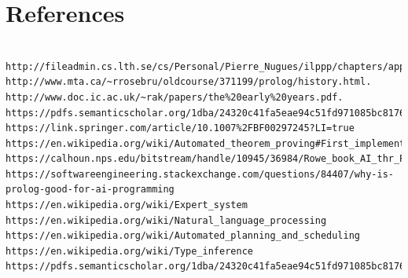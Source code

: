 \documentclass[14pt]{article}
\begin{document}
\section{References} 
\begin{verbatim}
	
http://fileadmin.cs.lth.se/cs/Personal/Pierre_Nugues/ilppp/chapters/appA.pdf.
http://www.mta.ca/~rrosebru/oldcourse/371199/prolog/history.html. 
http://www.doc.ic.ac.uk/~rak/papers/the%20early%20years.pdf.
https://pdfs.semanticscholar.org/1dba/24320c41fa5eae94c51fd971085bc8176dd7.pdf
https://link.springer.com/article/10.1007%2FBF00297245?LI=true
https://en.wikipedia.org/wiki/Automated_theorem_proving#First_implementations
https://calhoun.nps.edu/bitstream/handle/10945/36984/Rowe_book_AI_thr_Prolog_preface.pdf https://softwareengineering.stackexchange.com/questions/84407/why-is-prolog-good-for-ai-programming
https://en.wikipedia.org/wiki/Expert_system
https://en.wikipedia.org/wiki/Natural_language_processing 
https://en.wikipedia.org/wiki/Automated_planning_and_scheduling 
https://en.wikipedia.org/wiki/Type_inference https://pdfs.semanticscholar.org/1dba/24320c41fa5eae94c51fd971085bc8176dd7.pdf 

\end{verbatim}
\end{document}
